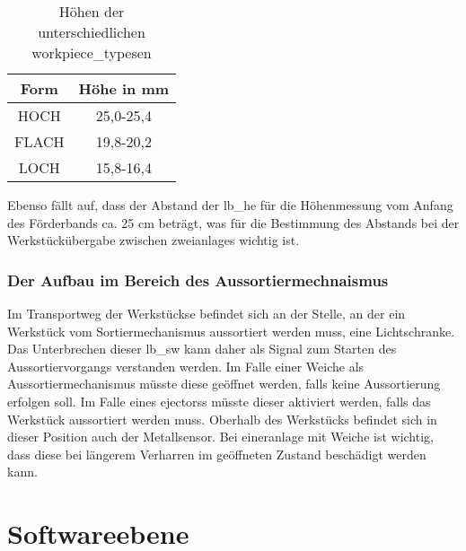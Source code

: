\begin{table}[h]
    \begin{center}
        \begin{tabular}{ |c|c| }
            \hline
            Form                     & Höhe in mm \\
            \hline\hline
            HOCH                 &  25,0-25,4\\
            \hline
            FLACH                     & 19,8-20,2 \\
            \hline
            LOCH               & 15,8-16,4 \\
            \hline
        \end{tabular}
    \end{center}
    \caption{Höhen der unterschiedlichen \glspl{workpiece_type}en}
    \label{tab:werkstuecke}
\end{table}

Ebenso fällt auf, dass der Abstand der \gls{lb_he} für die Höhenmessung vom Anfang des Förderbands ca. 25 cm beträgt,
was für die Bestimmung des Abstands bei der Werkstückübergabe zwischen zwei\glspl{anlage} wichtig ist.

\subsubsection{Der Aufbau im Bereich des Aussortiermechnaismus}

Im Transportweg der \Glspl{Werkstück}e befindet sich an der Stelle, an der ein \Gls{Werkstück} vom Sortiermechanismus aussortiert
werden muss, eine Lichtschranke.
Das Unterbrechen dieser \gls{lb_sw} kann daher als Signal zum Starten des Aussortiervorgangs verstanden werden.
Im Falle einer Weiche als Aussortiermechanismus müsste diese geöffnet werden, falls keine Aussortierung erfolgen soll.
Im Falle eines \Gls{ejector}ss müsste dieser aktiviert werden, falls das \Gls{Werkstück} aussortiert werden muss.
Oberhalb des \Gls{Werkstück}s befindet sich in dieser Position auch der Metallsensor.
Bei einer\gls{anlage} mit Weiche ist wichtig, dass diese bei längerem Verharren im geöffneten Zustand beschädigt werden kann.

\section{Softwareebene}\label{sec:softwareebene}


